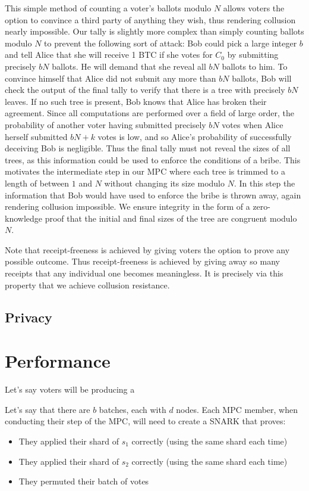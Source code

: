 \documentclass{article}
\begin{document}
This simple method of counting a voter's ballots modulo $N$ allows voters the option to convince a third party of anything they wish, thus rendering collusion nearly impossible.  Our tally is slightly more complex than simply counting ballots modulo $N$ to prevent the following sort of attack: Bob could pick a large integer $b$ and tell Alice that she will receive 1 BTC if she votes for $C_0$ by submitting precisely $bN$ ballots.  He will demand that she reveal all $bN$ ballots to him.  To convince himself that Alice did not submit any more than $bN$ ballots, Bob will check the output of the final tally to verify that there is a tree with precisely $bN$ leaves.  If no such tree is present, Bob knows that Alice has broken their agreement.  Since all computations are performed over a field of large order, the probability of another voter having submitted precisely $bN$ votes when Alice herself submitted $bN+k$ votes is low, and so Alice's probability of successfully deceiving Bob is negligible.  Thus the final tally must not reveal the sizes of all trees, as this information could be used to enforce the conditions of a bribe.  This motivates the intermediate step in our MPC where each tree is trimmed to a length of between $1$ and $N$ without changing its size modulo $N$.  In this step the information that Bob would have used to enforce the bribe is thrown away, again rendering collusion impossible.  We ensure integrity in the form of a zero-knowledge proof that the initial and final sizes of the tree are congruent modulo $N$.

Note that receipt-freeness is achieved by giving voters the option to prove any possible outcome.  Thus receipt-freeness is achieved by giving away so many receipts that any individual one becomes meaningless.  It is precisely via this property that we achieve collusion resistance.

\subsection{Privacy}


\section{Performance}
Let's say voters will be producing a 

Let's say that there are $b$ batches, each with $d$ nodes. Each MPC member, when conducting their step of the MPC, will need to create a SNARK that proves:
\begin{itemize}
    \item They applied their shard of $s_1$ correctly (using the same shard each time)
    \item They applied their shard of $s_2$ correctly (using the same shard each time)
    \item They permuted their batch of votes
\end{itemize}
\end{document}

